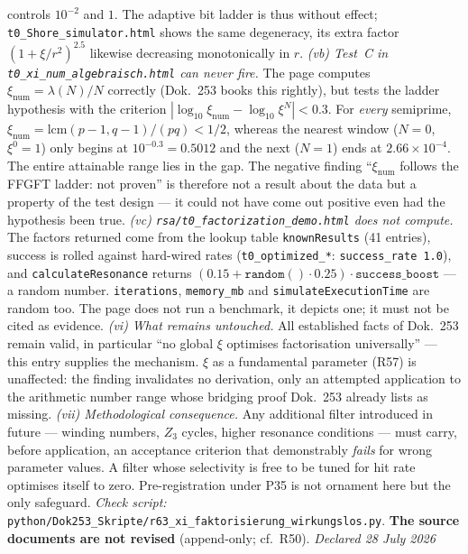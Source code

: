 controls $10^{-2}$ and $1$. The adaptive bit ladder is thus without   effect; \texttt{t0\_Shore\_simulator.html} shows the same degeneracy,   its extra factor $(1+\xi/r^2)^{2.5}$ likewise decreasing monotonically   in $r$.   \emph{(vb) Test~C in \texttt{t0\_xi\_num\_algebraisch.html} can never   fire.} The page computes $\xi_\text{num} = \lambda(N)/N$ correctly   (Dok.~253 books this rightly), but tests the ladder hypothesis with the   criterion $|\log_{10}\xi_\text{num} - \log_{10}\xi^N| < 0.3$. For   \emph{every} semiprime, $\xi_\text{num} = \mathrm{lcm}(p-1,q-1)/(pq)   < 1/2$, whereas the nearest window ($N=0$, $\xi^0 = 1$) only begins at   $10^{-0.3} = 0.5012$ and the next ($N=1$) ends at   $2.66\times10^{-4}$. The entire attainable range lies in the gap. The   negative finding \enquote{$\xi_\text{num}$ follows the FFGFT ladder: not   proven} is therefore not a result about the data but a property of the   test design --- it could not have come out positive even had the   hypothesis been true.   \emph{(vc) \texttt{rsa/t0\_factorization\_demo.html} does not compute.}   The factors returned come from the lookup table \texttt{knownResults}   (41 entries), success is rolled against hard-wired rates   (\texttt{t0\_optimized\_*}: \texttt{success\_rate 1.0}), and   \texttt{calculateResonance} returns   $(0.15 + \texttt{random}()\cdot 0.25)\cdot\texttt{success\_boost}$ ---   a random number. \texttt{iterations}, \texttt{memory\_mb} and   \texttt{simulateExecutionTime} are random too. The page does not run a   benchmark, it depicts one; it must not be cited as evidence.   \emph{(vi) What remains untouched.} All established facts of Dok.~253   remain valid, in particular \enquote{no global $\xi$ optimises   factorisation universally} --- this entry supplies the mechanism. $\xi$   as a fundamental parameter (R57) is unaffected: the finding invalidates   no derivation, only an attempted application to the arithmetic number   range whose bridging proof Dok.~253 already lists as missing.   \emph{(vii) Methodological consequence.} Any additional filter   introduced in future --- winding numbers, $Z_3$ cycles, higher resonance   conditions --- must carry, before application, an acceptance criterion   that demonstrably \emph{fails} for wrong parameter values. A filter   whose selectivity is free to be tuned for hit rate optimises itself to   zero. Pre-registration under P35 is not ornament here but the only   safeguard.   \emph{Check script:}   \texttt{python/\allowbreak Dok253\_\allowbreak Skripte/\allowbreak r63\_\allowbreak xi\_\allowbreak faktorisierung\_\allowbreak wirkungslos.py}.   \textbf{The source documents are not revised}   (append-only; cf.\ R50). \emph{Declared 28 July 2026}

